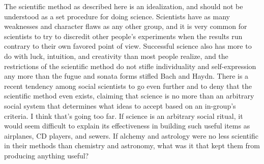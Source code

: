  The scientific method as described here is an idealization,
and should not be understood as a set procedure for doing
science. Scientists have as many weaknesses and character
flaws as any other group, and it is very common for
scientists to try to discredit other people's experiments
when the results run contrary to their own favored point of
view. Successful science also has more to do with luck,
intuition, and creativity than most people realize, and the
restrictions of the scientific method do not stifle
individuality and self-expression any more than the fugue
and sonata forms stifled Bach and Haydn. There is a recent
tendency among social scientists to go even further and to
deny that the scientific method even exists, claiming that
science is no more than an arbitrary social system that
determines what ideas to accept based on an in-group's
criteria. I think that's going too far. If science is an
arbitrary social ritual, it would seem difficult to explain
its effectiveness in building such useful items as
airplanes, CD players, and sewers. If alchemy
and astrology were no less scientific in
their methods than chemistry and astronomy, what was it that
kept them from producing anything useful?






